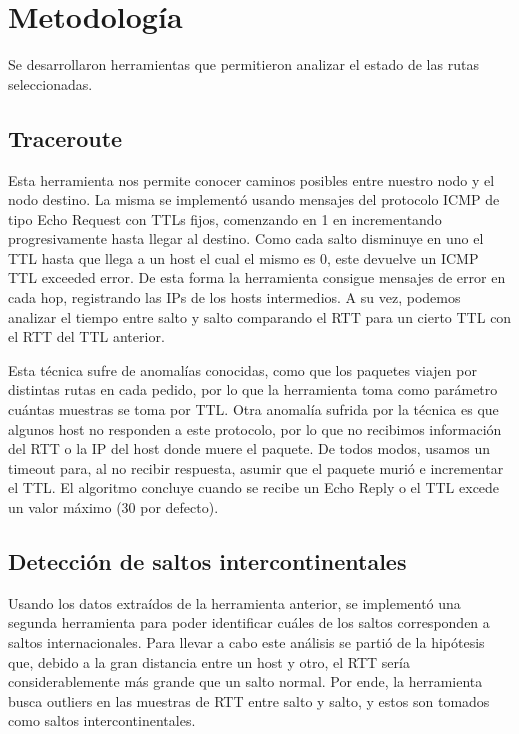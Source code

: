 \section{Metodología}

Se desarrollaron herramientas que permitieron analizar el estado de las rutas seleccionadas.

\subsection{Traceroute}

Esta herramienta nos permite conocer caminos posibles entre nuestro nodo y el nodo destino. La misma se implementó usando mensajes del protocolo ICMP de tipo Echo Request con TTLs fijos, comenzando en 1 en incrementando progresivamente hasta llegar al destino. Como cada salto disminuye en uno el TTL hasta que llega a un host el cual el mismo es 0, este devuelve un ICMP TTL exceeded error. De esta forma la herramienta consigue mensajes de error en cada hop, registrando las IPs de los hosts intermedios. A su vez, podemos analizar el tiempo entre salto y salto comparando el RTT para un cierto TTL con el RTT del TTL anterior.

Esta técnica sufre de anomalías conocidas, como que los paquetes viajen por distintas rutas en cada pedido, por lo que la herramienta toma como parámetro cuántas muestras se toma por TTL. Otra anomalía sufrida por la técnica es que algunos host no responden a este protocolo, por lo que no recibimos información del RTT o la IP del host donde muere el paquete. De todos modos, usamos un timeout para, al no recibir respuesta, asumir que el paquete murió e incrementar el TTL. El algoritmo concluye cuando se recibe un Echo Reply o el TTL excede un valor máximo (30 por defecto).

\subsection{Detección de saltos intercontinentales}

Usando los datos extraídos de la herramienta anterior, se implementó una segunda herramienta para poder identificar cuáles de los saltos corresponden a saltos internacionales. Para llevar a cabo este análisis se partió de la hipótesis que, debido a la gran distancia entre un host y otro, el RTT sería considerablemente más grande que un salto normal. Por ende, la herramienta busca outliers en las muestras de RTT entre salto y salto, y estos son tomados como saltos intercontinentales.

